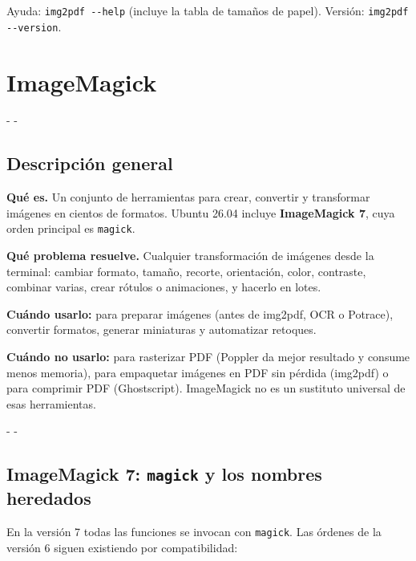 \documentclass[11pt,a4paper]{article}
\makeatletter
\newcommand{\necesitaespacio}[1]{\par\penalty-100\begingroup
	\setlength{\dimen@}{#1}\dimen@ii\pagegoal\advance\dimen@ii-\pagetotal
	\ifdim\dimen@>\dimen@ii\ifdim\dimen@ii>\z@\vfil\fi\penalty-\@M\fi\endgroup}
\newcommand{\cmd}[1]{\texttt{\textcolor{colcmd}{#1}}}      %
\makeatother
\begin{document}
	Ayuda: \cmd{img2pdf -{}-help} (incluye la tabla de tamaños de papel). Versión: \cmd{img2pdf -{}-version}.
	
	\clearpage
	\section{ImageMagick}\label{sec:imagemagick}
	
	\necesitaespacio{8\baselineskip}
	\subsection{Descripción general}
	
	\textbf{Qué es.} Un conjunto de herramientas para crear, convertir y transformar imágenes en cientos de formatos. Ubuntu 26.04 incluye \textbf{ImageMagick 7}, cuya orden principal es \cmd{magick}.
	
	\textbf{Qué problema resuelve.} Cualquier transformación de imágenes desde la terminal: cambiar formato, tamaño, recorte, orientación, color, contraste, combinar varias, crear rótulos o animaciones, y hacerlo en lotes.
	
	\textbf{Cuándo usarlo:} para preparar imágenes (antes de img2pdf, OCR o Potrace), convertir formatos, generar miniaturas y automatizar retoques.
	
	\textbf{Cuándo no usarlo:} para rasterizar PDF (Poppler da mejor resultado y consume menos memoria), para empaquetar imágenes en PDF sin pérdida (img2pdf) o para comprimir PDF (Ghostscript). ImageMagick no es un sustituto universal de esas herramientas.
	
	\necesitaespacio{20\baselineskip}
	\subsection{ImageMagick 7: \texttt{magick} y los nombres heredados}
	
	En la versión 7 todas las funciones se invocan con \cmd{magick}. Las órdenes de la versión 6 siguen existiendo por compatibilidad:
	
\end{document}
